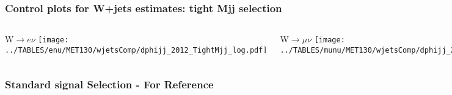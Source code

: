 \documentclass[red,compress,xcolor=table]{beamer}
\begin{document}
%
%


\begin{frame}
  \frametitle{Control plots for W+jets estimates: tight Mjj selection}

\begin{columns}
  \begin{block}{W$\rightarrow e\nu$}
    \texttt{[image: ../TABLES/enu/MET130/wjetsComp/dphijj\_2012\_TightMjj\_log.pdf]}
  \end{block}
  \begin{block}{W$\rightarrow \mu\nu$}
    \texttt{[image: ../TABLES/munu/MET130/wjetsComp/dphijj\_2012\_TightMjj\_log.pdf]}
  \end{block}
  \begin{block}{W$\rightarrow \tau\nu$}
    \texttt{[image: ../TABLES/taunu/MET130/wjetsComp/dphijj\_2012\_TightMjj\_log.pdf]}
  \end{block}
\end{columns}


\end{frame}


\begin{frame}
  \frametitle{Standard signal Selection - For Reference}

\vspace*{-1cm}
\begin{center}
{\tiny
\hspace*{-1cm}

}
\end{center}

\end{frame}
\end{document}
